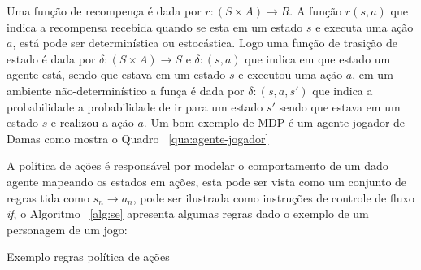 Uma função de recompença é dada por  $r: (S \times A) \rightarrow R$. A função $r(s,a)$ que indica a recompensa 
recebida quando se esta em um estado $s$ e executa uma ação $a$, está pode ser determinística ou estocástica. Logo uma 
função de trasição de estado é dada por $\delta:(S \times A) \rightarrow S $ e $\delta:(s,a)$ que indica em que 
estado um agente está, sendo que estava em um estado $s$ e executou uma ação $a$, em um ambiente não-determinístico
a funça é dada por $\delta:(s,a,s')$ que indica a probabilidade a probabilidade de ir para um estado $s'$ sendo que
estava em um estado $s$ e realizou a ação $a$.
Um bom exemplo de MDP é um agente jogador de Damas como mostra o Quadro ~\ref{qua:agente-jogador}

\begin{quadro}[h!]	
	\centering
\end{quadro}  

A política de ações é responsável por modelar o comportamento de um dado agente mapeando os estados em ações, esta pode 
ser vista como um conjunto de regras tida como $s_{n} \rightarrow a_{n}$, pode ser ilustrada como instruções de controle 
de fluxo \textit{if}, o Algoritmo ~\ref{alg:se} apresenta algumas regras dado o exemplo de um personagem de um jogo:
\begin{algorithm}[h!]
	\SetSpacedAlgorithm
	\caption{\label{alg:se}Exemplo regras política de ações}
\end{algorithm}   


